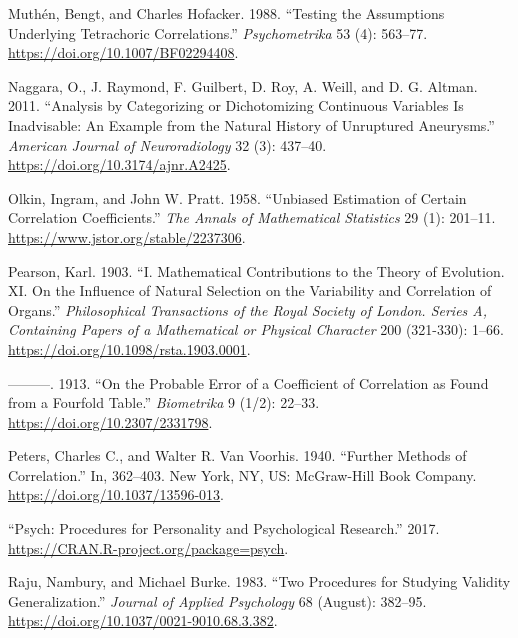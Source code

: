 \documentclass[
  letterpaper,
  DIV=11,
  numbers=noendperiod]{scrreprt}
\newlength{\cslhangindent}
\newlength{\cslentryspacingunit} %
\newenvironment{CSLReferences}[2] %
 {%
  \setlength{\parindent}{0pt}
  \ifodd #1
  \let\oldpar\par
  \def\par{\hangindent=\cslhangindent\oldpar}
  \fi
  \setlength{\parskip}{#2\cslentryspacingunit}
 }%
 {}
\begin{document}
\begin{CSLReferences}{1}{0}
\leavevmode{}%
Muthén, Bengt, and Charles Hofacker. 1988. {``Testing the Assumptions
Underlying Tetrachoric Correlations.''} \emph{Psychometrika} 53 (4):
563--77. \url{https://doi.org/10.1007/BF02294408}.

\leavevmode{}%
Naggara, O., J. Raymond, F. Guilbert, D. Roy, A. Weill, and D. G.
Altman. 2011. {``Analysis by Categorizing or Dichotomizing Continuous
Variables Is Inadvisable: An Example from the Natural History of
Unruptured Aneurysms.''} \emph{American Journal of Neuroradiology} 32
(3): 437--40. \url{https://doi.org/10.3174/ajnr.A2425}.

\leavevmode{}%
Olkin, Ingram, and John W. Pratt. 1958. {``Unbiased Estimation of
Certain Correlation Coefficients.''} \emph{The Annals of Mathematical
Statistics} 29 (1): 201--11. \url{https://www.jstor.org/stable/2237306}.

\leavevmode{}%
Pearson, Karl. 1903. {``I. Mathematical Contributions to the Theory of
Evolution. {\textemdash}XI. On the Influence of Natural Selection on the
Variability and Correlation of Organs.''} \emph{Philosophical
Transactions of the Royal Society of London. Series A, Containing Papers
of a Mathematical or Physical Character} 200 (321-330): 1--66.
\url{https://doi.org/10.1098/rsta.1903.0001}.

\leavevmode{}%
---------. 1913. {``On the Probable Error of a Coefficient of
Correlation as Found from a Fourfold Table.''} \emph{Biometrika} 9
(1/2): 22--33. \url{https://doi.org/10.2307/2331798}.

\leavevmode{}%
Peters, Charles C., and Walter R. Van Voorhis. 1940. {``Further Methods
of Correlation.''} In, 362--403. New York, NY, US: McGraw-Hill Book
Company. \url{https://doi.org/10.1037/13596-013}.

\leavevmode{}%
{``Psych: Procedures for Personality and Psychological Research.''}
2017. \url{https://CRAN.R-project.org/package=psych}.

\leavevmode{}%
Raju, Nambury, and Michael Burke. 1983. {``Two Procedures for Studying
Validity Generalization.''} \emph{Journal of Applied Psychology} 68
(August): 382--95. \url{https://doi.org/10.1037/0021-9010.68.3.382}.


\end{CSLReferences}
\end{document}

